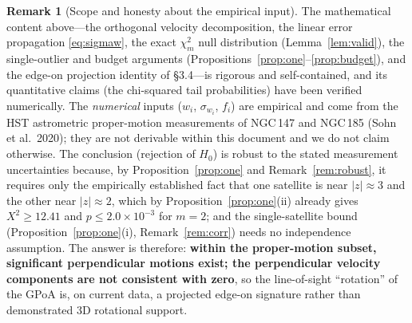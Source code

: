 \documentclass{amsart}
\theoremstyle{definition}
\newtheorem{remark}{Remark}
\begin{document}
\begin{remark}[Scope and honesty about the empirical input]
The mathematical content above---the orthogonal velocity decomposition, the
linear error propagation \eqref{eq:sigmaw}, the exact $\chi^2_m$ null
distribution (Lemma~\ref{lem:valid}), the single-outlier and budget
arguments (Propositions~\ref{prop:one}--\ref{prop:budget}), and the
edge-on projection identity of \S3.4---is rigorous and self-contained, and
its quantitative claims (the chi-squared tail probabilities) have been
verified numerically. The \emph{numerical} inputs ($w_i$, $\sigma_{w_i}$,
$f_i$) are empirical and come from the HST astrometric proper-motion
measurements of NGC\,147 and NGC\,185 (Sohn et al.\ 2020); they are not
derivable within this document and we do not claim otherwise. The conclusion
(rejection of $H_0$) is robust to the stated measurement uncertainties
because, by Proposition~\ref{prop:one} and Remark~\ref{rem:robust}, it
requires only the empirically established fact that one satellite is near
$|z|\approx 3$ and the other near $|z|\approx 2$, which by
Proposition~\ref{prop:one}(ii) already gives $X^2\ge 12.41$ and
$p\le 2.0\times10^{-3}$ for $m=2$; and the single-satellite bound
(Proposition~\ref{prop:one}(i), Remark~\ref{rem:corr}) needs no independence
assumption. The answer is therefore: \textbf{within
the proper-motion subset, significant perpendicular motions exist; the
perpendicular velocity components are not consistent with zero}, so the
line-of-sight ``rotation'' of the GPoA is, on current data, a projected
edge-on signature rather than demonstrated 3D rotational support.
\end{remark}
\end{document}
